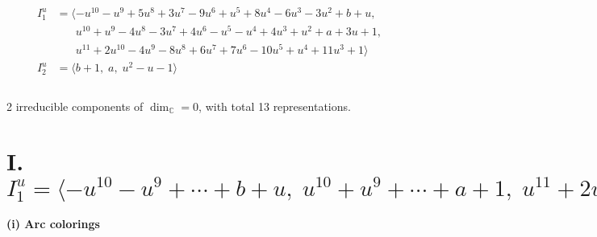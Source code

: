 \documentclass[1p]{elsarticle_modified}
\theoremstyle{definition}
\begin{document}
\begin{align*}
I^u_{1}&=\langle 
- u^{10}- u^9+5 u^8+3 u^7-9 u^6+u^5+8 u^4-6 u^3-3 u^2+b+u,\\
\phantom{I^u_{1}}&\phantom{= \langle  }u^{10}+u^9-4 u^8-3 u^7+4 u^6- u^5- u^4+4 u^3+u^2+a+3 u+1,\\
\phantom{I^u_{1}}&\phantom{= \langle  }u^{11}+2 u^{10}-4 u^9-8 u^8+6 u^7+7 u^6-10 u^5+u^4+11 u^3+1\rangle \\
I^u_{2}&=\langle 
b+1,\;a,\;u^2- u-1\rangle \\
\\
\end{align*}
\raggedright * 2 irreducible components of $\dim_{\mathbb{C}}=0$, with total 13 representations.\\
\newpage
\renewcommand{\arraystretch}{1}
\centering \section*{I. $I^u_{1}= \langle - u^{10}- u^9+\cdots+b+u,\;u^{10}+u^9+\cdots+a+1,\;u^{11}+2 u^{10}+\cdots+11 u^3+1 \rangle$}
\flushleft \textbf{(i) Arc colorings}\\
\end{document}
